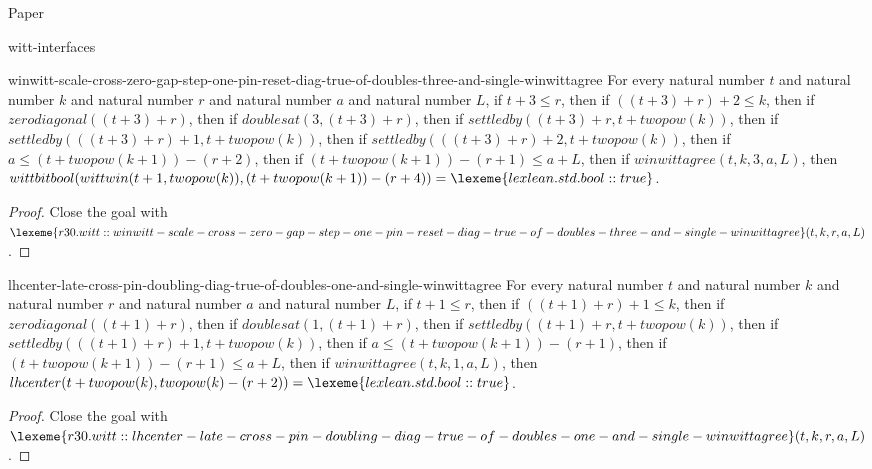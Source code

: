 \begin{lexlean}{Paper}
\begin{section}{witt-interfaces}
  \begin{theorem}{winwitt-scale-cross-zero-gap-step-one-pin-reset-diag-true-of-doubles-three-and-single-winwittagree}
  For every natural number \(t\) and natural number \(k\) and natural number \(r\) and natural number \(a\) and natural number \(L\), if \(t + 3 ≤ r\), then if \(((t + 3) + r) + 2 ≤ k\), then if \(zerodiagonal((t + 3) + r)\), then if \(doublesat(3, (t + 3) + r)\), then if \(settledby((t + 3) + r, t + twopow(k))\), then if \(settledby(((t + 3) + r) + 1, t + twopow(k))\), then if \(settledby(((t + 3) + r) + 2, t + twopow(k))\), then if \(a ≤ (t + twopow(k + 1)) - (r + 2)\), then if \((t + twopow(k + 1)) - (r + 1) ≤ a + L\), then if \(winwittagree(t, k, 3, a, L)\), then \(wittbitbool(wittwin(t + 1, twopow(k)), (t + twopow(k + 1)) - (r + 4)) = \lexeme{lexlean.std.bool::true}\).
  \begin{proof}
  Close the goal with \(\lexeme{r30.witt::winwitt-scale-cross-zero-gap-step-one-pin-reset-diag-true-of-doubles-three-and-single-winwittagree}(t, k, r, a, L)\).
  \end{proof}
  \end{theorem}

  \begin{theorem}{lhcenter-late-cross-pin-doubling-diag-true-of-doubles-one-and-single-winwittagree}
  For every natural number \(t\) and natural number \(k\) and natural number \(r\) and natural number \(a\) and natural number \(L\), if \(t + 1 ≤ r\), then if \(((t + 1) + r) + 1 ≤ k\), then if \(zerodiagonal((t + 1) + r)\), then if \(doublesat(1, (t + 1) + r)\), then if \(settledby((t + 1) + r, t + twopow(k))\), then if \(settledby(((t + 1) + r) + 1, t + twopow(k))\), then if \(a ≤ (t + twopow(k + 1)) - (r + 1)\), then if \((t + twopow(k + 1)) - (r + 1) ≤ a + L\), then if \(winwittagree(t, k, 1, a, L)\), then \(lhcenter(t + twopow(k), twopow(k) - (r + 2)) = \lexeme{lexlean.std.bool::true}\).
  \begin{proof}
  Close the goal with \(\lexeme{r30.witt::lhcenter-late-cross-pin-doubling-diag-true-of-doubles-one-and-single-winwittagree}(t, k, r, a, L)\).
  \end{proof}
  \end{theorem}


\end{section}
\end{lexlean}
